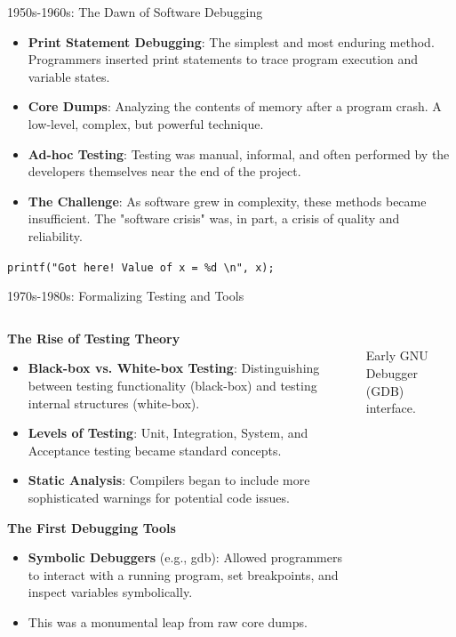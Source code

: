 \documentclass{beamer}
\begin{document}
\begin{frame}[t]{1950s-1960s: The Dawn of Software Debugging}
\begin{itemize}
    \item \textbf{Print Statement Debugging}: The simplest and most enduring method. Programmers inserted print statements to trace program execution and variable states.
    \item \textbf{Core Dumps}: Analyzing the contents of memory after a program crash. A low-level, complex, but powerful technique.
    \item \textbf{Ad-hoc Testing}: Testing was manual, informal, and often performed by the developers themselves near the end of the project.
    \item \textbf{The Challenge}: As software grew in complexity, these methods became insufficient. The "software crisis" was, in part, a crisis of quality and reliability.
\end{itemize}
\begin{center}
    \texttt{printf("Got here! Value of x = \%d \textbackslash n", x);} %
\end{center}
\end{frame}

\begin{frame}[t]{1970s-1980s: Formalizing Testing and Tools}
\begin{columns}
    \begin{column}{0.6\textwidth}
        \textbf{The Rise of Testing Theory}
        \begin{itemize}
            \item \textbf{Black-box vs. White-box Testing}: Distinguishing between testing functionality (black-box) and testing internal structures (white-box).
            \item \textbf{Levels of Testing}: Unit, Integration, System, and Acceptance testing became standard concepts.
            \item \textbf{Static Analysis}: Compilers began to include more sophisticated warnings for potential code issues.
        \end{itemize}
        \textbf{The First Debugging Tools}
        \begin{itemize}
            \item \textbf{Symbolic Debuggers} (e.g., gdb): Allowed programmers to interact with a running program, set breakpoints, and inspect variables symbolically.
            \item This was a monumental leap from raw core dumps.
        \end{itemize}
    \end{column}
    \begin{column}{0.4\textwidth}
        \\\scriptsize{Early GNU Debugger (GDB) interface.}
    \end{column}
\end{columns}
\end{frame}
\end{document}
